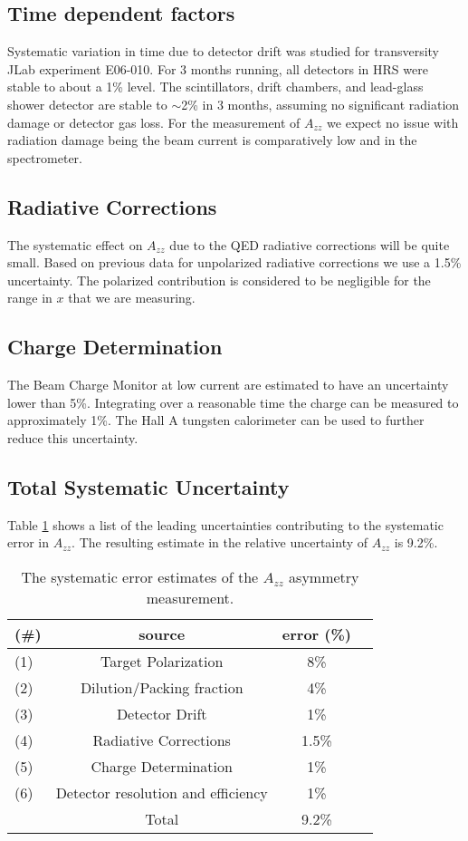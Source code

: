\documentclass[12pt]{article}
\begin{document}
\subsection{ Time dependent factors }

Systematic variation in time due to detector drift was
studied for transversity JLab experiment E06-010. For 3 months running, all detectors in
HRS were stable to about a 1\% level.  The scintillators, drift chambers, and 
lead-glass shower detector are stable to $\sim$2\% in 3 months, assuming
no significant radiation damage or detector gas loss.
For the measurement of $A_{zz}$ we expect no issue with radiation damage
being the beam current is comparatively low and in the spectrometer.

\subsection{ Radiative Corrections }
The systematic effect on $A_{zz}$ due to the QED radiative corrections will be quite small. 
Based on previous data for unpolarized radiative corrections we use a 1.5\% uncertainty.
The polarized contribution is considered to be negligible for the range in $x$ that we
are measuring.

\subsection{ Charge Determination }
The Beam Charge Monitor at low current are estimated to have an uncertainty 
lower than 5\%.  Integrating over a reasonable time the charge can be measured to 
approximately 1\%.  The Hall A tungsten calorimeter can be used to further reduce this uncertainty.

\subsection{ Total Systematic Uncertainty }
Table \ref{error1} shows a list of the leading uncertainties contributing to the systematic error in $A_{zz}$.
The resulting estimate in the relative uncertainty of $A_{zz}$ is 9.2\%.
\begin{table}
\begin{center}
\begin{tabular}{lccc}
(\#)&source & error (\%)\\ \hline  
(1)&Target Polarization & 8\% \\
(2)&Dilution/Packing fraction & 4\% \\
(3)&Detector Drift & 1\% \\
(4)&Radiative Corrections & 1.5\% \\
(5)&Charge Determination & 1\% \\
(6)&Detector resolution and efficiency & 1\% \\\hline
   &Total & 9.2\% \\\hline
\end{tabular}
\end{center}
\caption{The systematic error estimates of the $A_{zz}$ asymmetry measurement.}
\label{error1}
\end{table}
\end{document}
